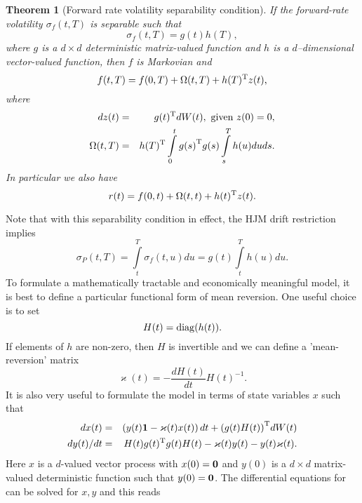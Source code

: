 \documentclass[11pt,a4paper]{article}
\newtheorem{theorem}{Theorem}[section]
\numberwithin{equation}{section}
\begin{document}
\begin{theorem}[Forward rate volatility separability condition]
If the forward-rate volatility ${\sigma _f}(t,T)$ is separable such that
\begin{equation*}
  {\sigma _f}(t,T) = g(t)h(T),
\end{equation*}
where $g$ is a $d \times d$ deterministic matrix-valued function and $h$ is a $d$--dimensional vector-valued function,
then $f$ is Markovian and
\begin{equation*}
  f(t,T) = f(0,T) + \Omega (t,T) + h{(T)^{\rm{T}}}z(t),
\end{equation*}
where
\begin{eqnarray*}
dz(t) &=& g{(t)^{\rm{T}}}dW(t), \text{ given } z(0) = 0,\\
\Omega (t,T) &=& h{(T)^{\rm{T}}}\int\limits_0^t {g{{(s)}^{\rm{T}}}g(s)\int\limits_s^T {h(u)du} ds}.
\end{eqnarray*}
In particular we also have
\begin{equation*}
  r(t) = f(0,t) + \Omega (t,t) + h{(t)^{\rm{T}}}z(t).
\end{equation*}
\end{theorem}
Note that with this separability condition in effect, the HJM drift restriction implies
\begin{equation}\label{eq:sigmaP_gaussian2f}
  {\sigma _P}(t,T) = \int\limits_t^T {{\sigma _f}(t,u)du}  = g(t)\int\limits_t^T {h(u)du}.
\end{equation}
To formulate a mathematically tractable and economically meaningful model, it is best to define a particular functional form of mean reversion. One useful choice is to set
\begin{equation*}
  H(t) = {\rm{diag}}(h(t)).
\end{equation*}
If elements of $h$ are non-zero, then $H$ is invertible and we can define a 'mean-reversion' matrix
\begin{equation}\label{eq:MR_mat_gaussian}
  \varkappa(t)  =  - \frac{{dH(t)}}{{dt}}H{(t)^{ - 1}}.
\end{equation}
It is also very useful to formulate the model in terms of state variables $x$ such that
\begin{eqnarray}
dx(t) &=& \left( {y(t){\bf{1}} - \varkappa (t)x(t)} \right)dt + {\left( {g(t)H(t)} \right)^{\rm{T}}}dW(t)\nonumber \\
dy(t)/dt &=& H(t)g{(t)^{\rm{T}}}g(t)H(t) - \varkappa (t)y(t) - y(t)\varkappa (t).\label{eq:dx_dy_gaussian2f}
\end{eqnarray}
Here $x$ is a $d$-valued vector process with $x(0) = {\bf{0}}$ and $y(0)$ is a $d \times d$ matrix-valued deterministic function such that $y(0)={\bf{0}}$. The differential equations for can be solved for $x, y$ and this reads
\end{document}
